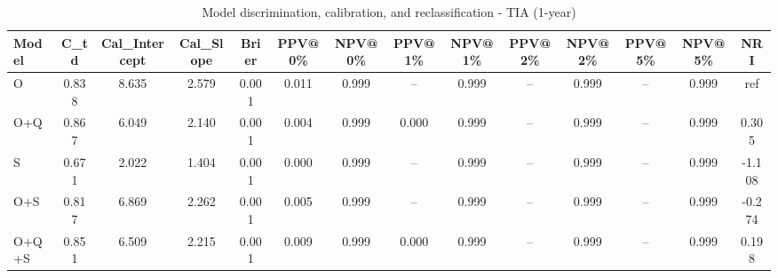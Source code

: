 \begin{table}[htbp]
\centering
\small
\caption{Model discrimination, calibration, and reclassification - TIA (1-year)}
\label{tab:perf_tia_1y}
\begin{tabular}{lccccccccccccc}
\toprule
Model & C\_td & Cal\_Intercept & Cal\_Slope & Brier & PPV@0\% & NPV@0\% & PPV@1\% & NPV@1\% & PPV@2\% & NPV@2\% & PPV@5\% & NPV@5\% & NRI \\
\midrule
O & 0.838 & 8.635 & 2.579 & 0.001 & 0.011 & 0.999 & -- & 0.999 & -- & 0.999 & -- & 0.999 & ref \\
O+Q & 0.867 & 6.049 & 2.140 & 0.001 & 0.004 & 0.999 & 0.000 & 0.999 & -- & 0.999 & -- & 0.999 & 0.305 \\
S & 0.671 & 2.022 & 1.404 & 0.001 & 0.000 & 0.999 & -- & 0.999 & -- & 0.999 & -- & 0.999 & -1.108 \\
O+S & 0.817 & 6.869 & 2.262 & 0.001 & 0.005 & 0.999 & -- & 0.999 & -- & 0.999 & -- & 0.999 & -0.274 \\
O+Q+S & 0.851 & 6.509 & 2.215 & 0.001 & 0.009 & 0.999 & 0.000 & 0.999 & -- & 0.999 & -- & 0.999 & 0.198 \\
\bottomrule
\end{tabular}
\end{table}